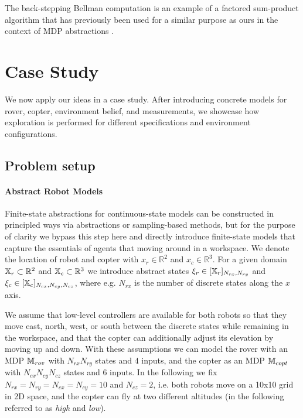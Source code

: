 \documentclass[conference]{IEEEtran}
\renewcommand{\cite}[1]{\citep{#1}}
\begin{document}
The back-stepping Bellman computation is an example of a factored sum-product algorithm \cite{Kschischang2001} that has previously been used for a similar purpose as ours in the context of MDP abstractions \cite{EsmaeilZadehSoudjani2017}.



\section{Case Study}
\label{sec:casestudy}

We now apply our ideas in a case study. After introducing concrete models for rover, copter, environment belief, and measurements, we showcase how exploration is performed for different specifications and environment configurations.

\subsection{Problem setup}

\paragraph{Abstract Robot Models}

Finite-state abstractions for continuous-state models can be constructed in principled ways via abstractions or sampling-based methods, but for the purpose of clarity we bypass this step here and directly introduce finite-state models that capture the essentials of agents that moving around in a workspace. We denote the location of robot and copter with $x_r \in \mathbb{R}^2$ and $x_c \in \mathbb{R}^3$. For a given domain $\mathbb{X}_r \subset \mathbb{R}^2$ and $\mathbb{X}_c \subset \mathbb{R}^3$ we introduce abstract states $\xi_r \in [\mathbb{X}_r]_{N_{rx}, N_{ry}}$ and $\xi_c \in [\mathbb{X}_c]_{N_{cx}, N_{cy}, N_{cz}}$, where e.g. $N_{rx}$ is the number of discrete states along the $x$ axis.

We assume that low-level controllers are available for both robots so that they move east, north, west, or south between the discrete states while remaining in the workspace, and that the copter can additionally adjust its elevation by moving up and down. With these assumptions we can model the rover with an MDP $\mathbb{M}_{rov}$ with $N_{rx} N_{ry}$ states and $4$ inputs, and the copter as an MDP $\mathbb{M}_{copt}$ with $N_{cx} N_{cy} N_{cz}$ states and $6$ inputs. In the following we fix $N_{rx} = N_{ry} = N_{cx} = N_{cy} = 10$ and $N_{cz} = 2$, i.e. both robots move on a 10x10 grid in 2D space, and the copter can fly at two different altitudes (in the following referred to as \emph{high} and \emph{low}).
\end{document}
